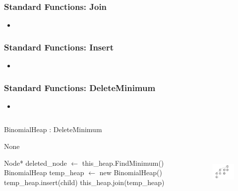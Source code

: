\documentclass[13pt]{beamer}
\begin{document}
\begin{frame}
\frametitle{Standard Functions: Join}
  \begin{itemize}
    \item
  \end{itemize}
\end{frame}

\begin{frame}
\frametitle{Standard Functions: Insert}
  \begin{itemize}
    \item
  \end{itemize}
\end{frame}

\begin{frame}
\frametitle{Standard Functions: DeleteMinimum}
  \begin{itemize}
    \item
  \end{itemize}

  \begin{columns}[T] %
    \begin{column}[T]{6cm} %
        \begin{algorithm}[H]
        \small
        \caption{BinomialHeap : DeleteMinimum}
        \begin{algorithmic}
          \REQUIRE None

          \STATE Node* deleted\_node $\leftarrow$ this\_heap.FindMinimum()
          \STATE BinomialHeap temp\_heap $\leftarrow$ new BinomialHeap()
              \STATE temp\_heap.insert(child)
          \ENDFOR
          \STATE this\_heap.join(temp\_heap)
        \end{algorithmic}
        \end{algorithm}
    \end{column}
    \begin{column}[T]{5.5cm} %
      \begin{figure}
        \includegraphics[height=5cm]{./img/postmerge.png}
      \end{figure}
    \end{column}
  \end{columns}
\end{frame}
\end{document}
